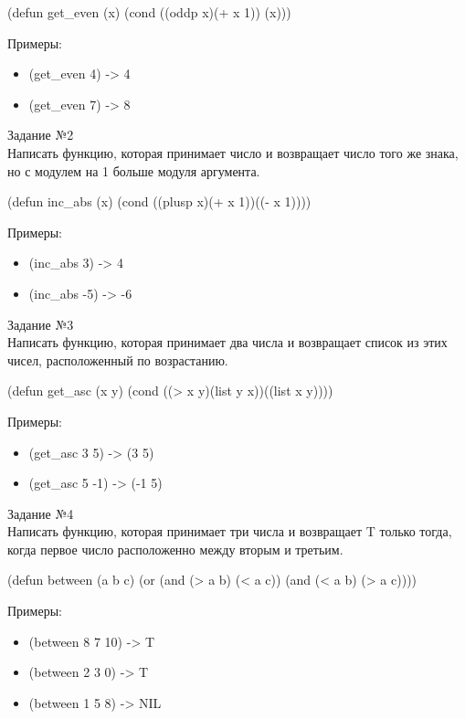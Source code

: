 (defun get\_even (x) (cond ((oddp x)(+ x 1)) (x)))

Примеры:
\begin{itemize}
\item (get\_even 4) -> 4
\item (get\_even 7) -> 8\\
\end{itemize}

{\LARGE Задание №2}\\

Написать функцию, которая принимает число и возвращает число того же знака, но с модулем на 1 больше модуля аргумента.

(defun inc\_abs (x) (cond ((plusp x)(+ x 1))((- x 1))))

Примеры:
\begin{itemize}
\item (inc\_abs 3) -> 4
\item (inc\_abs -5) -> -6\\
\end{itemize}

{\LARGE Задание №3}\\

Написать функцию, которая принимает два числа и возвращает список из этих чисел, расположенный по возрастанию.

 (defun get\_asc (x y) (cond ((> x y)(list y x))((list x y))))

Примеры:
\begin{itemize}
\item (get\_asc 3 5) -> (3 5)
\item (get\_asc 5 -1) -> (-1 5)\\
\end{itemize}

\newpage
\vspace*{10mm}
{\LARGE Задание №4}\\

Написать функцию, которая принимает три числа и возвращает T только тогда, когда первое число расположенно между вторым и третьим.

(defun between (a b c) (or (and (> a b) (< a c)) (and (< a b) (> a c))))

Примеры:
\begin{itemize}
\item (between 8 7 10) -> T
\item (between 2 3 0) -> T
\item (between 1 5 8) -> NIL\\
\end{itemize}

